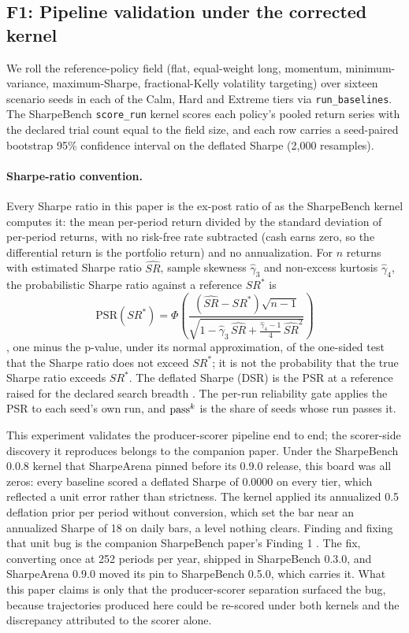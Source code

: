 \subsection{F1: Pipeline validation under the corrected kernel}\label{sec:f1}

We roll the reference-policy field (flat, equal-weight long, momentum, minimum-variance, maximum-Sharpe, fractional-Kelly volatility targeting) over sixteen scenario seeds in each of the Calm, Hard and Extreme tiers via \texttt{run\_baselines}. The SharpeBench \texttt{score\_run} kernel scores each policy's pooled return series with the declared trial count equal to the field size, and each row carries a seed-paired bootstrap 95\% confidence interval on the deflated Sharpe (2{,}000 resamples).

\paragraph{Sharpe-ratio convention.} Every Sharpe ratio in this paper is the ex-post ratio of \citet{sharpe1966mutual,sharpe1994sharpe} as the SharpeBench kernel computes it: the mean per-period return divided by the standard deviation of per-period returns, with no risk-free rate subtracted (cash earns zero, so the differential return is the portfolio return) and no annualization. For $n$ returns with estimated Sharpe ratio $\widehat{SR}$, sample skewness $\hat\gamma_3$ and non-excess kurtosis $\hat\gamma_4$, the probabilistic Sharpe ratio against a reference $SR^{*}$ is
\[
\mathrm{PSR}(SR^{*})=\Phi\!\left(\frac{(\widehat{SR}-SR^{*})\sqrt{n-1}}{\sqrt{1-\hat\gamma_3\,\widehat{SR}+\tfrac{\hat\gamma_4-1}{4}\,\widehat{SR}^{2}}}\right)
\]
\citep{bailey2012sharpe}, one minus the p-value, under its normal approximation, of the one-sided test that the Sharpe ratio does not exceed $SR^{*}$; it is not the probability that the true Sharpe ratio exceeds $SR^{*}$. The deflated Sharpe (DSR) is the PSR at a reference raised for the declared search breadth \citep{bailey2014deflated}. The per-run reliability gate applies the PSR to each seed's own run, and $\text{pass}^{k}$ is the share of seeds whose run passes it.

This experiment validates the producer-scorer pipeline end to end; the scorer-side discovery it reproduces belongs to the companion paper. Under the SharpeBench 0.0.8 kernel that SharpeArena pinned before its 0.9.0 release, this board was all zeros: every baseline scored a deflated Sharpe of 0.0000 on every tier, which reflected a unit error rather than strictness. The kernel applied its annualized 0.5 deflation prior per period without conversion, which set the bar near an annualized Sharpe of 18 on daily bars, a level nothing clears. Finding and fixing that unit bug is the companion SharpeBench paper's Finding 1 \citep{toca2026sharpebench}. The fix, converting once at 252 periods per year, shipped in SharpeBench 0.3.0, and SharpeArena 0.9.0 moved its pin to SharpeBench 0.5.0, which carries it. What this paper claims is only that the producer-scorer separation surfaced the bug, because trajectories produced here could be re-scored under both kernels and the discrepancy attributed to the scorer alone.

